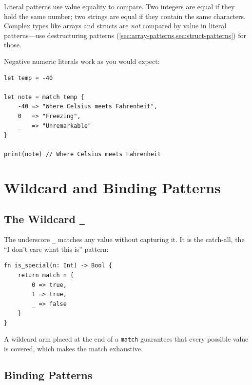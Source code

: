 Literal patterns use value equality to compare. Two integers are equal if they hold the same number; two strings are equal if they contain the same characters. Complex types like arrays and structs are \emph{not} compared by value in literal patterns---use destructuring patterns (\cref{sec:array-patterns,sec:struct-patterns}) for those.

Negative numeric literals work as you would expect:

\begin{lstlisting}[language=Lattice, caption={Negative literal patterns}]
let temp = -40

let note = match temp {
    -40 => "Where Celsius meets Fahrenheit",
    0   => "Freezing",
    _   => "Unremarkable"
}

print(note) // Where Celsius meets Fahrenheit
\end{lstlisting}

\section{Wildcard and Binding Patterns}\label{sec:wildcard-binding}

\subsection{The Wildcard \texttt{\_}}\label{sec:wildcard-pattern}

The underscore \lstinline|_| matches any value without capturing it. It is the catch-all, the ``I don't care what this is'' pattern:

\begin{lstlisting}[language=Lattice, caption={Wildcard as a catch-all}]
fn is_special(n: Int) -> Bool {
    return match n {
        0 => true,
        1 => true,
        _ => false
    }
}
\end{lstlisting}

A wildcard arm placed at the end of a \lstinline|match| guarantees that every possible value is covered, which makes the match exhaustive.

\subsection{Binding Patterns}\label{sec:binding-pattern}

